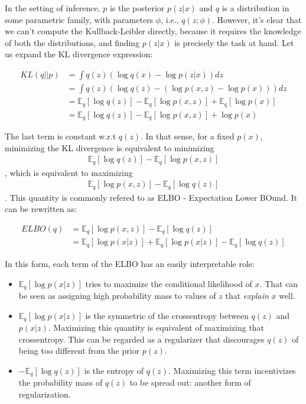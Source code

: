 In the setting of inference, $p$ is the posterior $p(z|x)$ and $q$ is a distribution
in some parametric family, with parameters $\phi$, i.e., $q(z; \phi)$. However,
it's clear that we can't compute the Kullback-Leibler directly, because it
requires the knowledge of both the distributions, and finding $p(z|x)$ is precisely
the task at hand. Let us expand the KL divergence expression:

\begin{align}
    KL(q||p) &= \int q(z) (\log q(x) - \log p(z|x)) dz \\
             &= \int q(z) (\log q(z) - (\log p(x, z) - \log p(x))) dz \\
             &= \mathbb{E}_q [\log q(z)] - \mathbb{E}_q [\log p(x, z)] + \mathbb{E}_q [\log p(x)] \\
             &= \mathbb{E}_q [\log q(z)] - \mathbb{E}_q [\log p(x, z)] + \log p(x)
\end{align}

The last term is constant w.r.t $q(z)$. In that sense, for a fixed $p(x)$,
minimizing the KL divergence is equivalent to minimizing
\begin{align}
    \mathbb{E}_q [\log q(z)] - \mathbb{E}_q [\log p(x, z)]
\end{align}, which is equivalent to maximizing
\begin{align}
    \mathbb{E}_q [\log p(x, z)] - \mathbb{E}_q [\log q(z)] \label{eq:elbokldiv}
\end{align}. This quantity is commonly refered to as ELBO - Expectation Lower BOund.
It can be rewritten as:

\begin{align}
    ELBO(q) &= \mathbb{E}_q [\log p(x, z)] - \mathbb{E}_q [\log q(z)] \\
            &= \mathbb{E}_q [\log p(x|z)] + \mathbb{E}_q [\log p(x|z)] - \mathbb{E}_q [\log q(z)]
\end{align}

In this form, each term of the ELBO has an easily interpretable role:
\begin{itemize}
    \item $\mathbb{E}_q [\log p(x|z)]$ tries to maximize the conditional likelihood of $x$. That
        can be seen as assigning high probability mass to values of $z$ that \emph{explain} $x$
        well.
    \item $\mathbb{E}_q [\log p(x|z)]$ is the symmetric of the crossentropy between
        $q(z)$ and $p(x|z)$. Maximizing this quantity is equivalent of maximizing
        that crossentropy. This can be regarded as a regularizer that discourages
        $q(z)$ of being too different from the prior $p(z)$.
    \item $ - \mathbb{E}_q [\log q(z)]$ is the entropy of $q(z)$. Maximizing
        this term incentivizes the probability mass of $q(z)$ to be spread out:
        another form of regularization.
\end{itemize}

